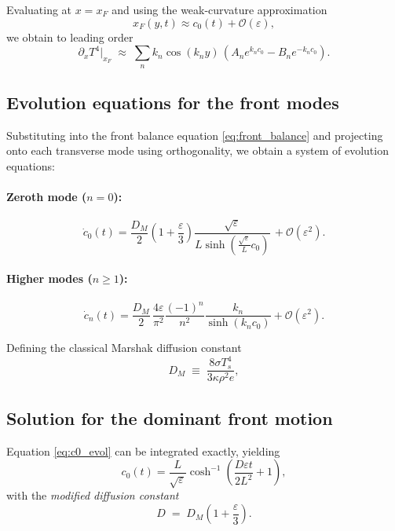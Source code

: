 \documentclass{article}
\begin{document}
Evaluating at $x=x_F$ and using the weak-curvature approximation
\[
x_F(y,t) \approx c_0(t) + \mathcal{O}(\varepsilon),
\]
we obtain to leading order
\begin{equation}
\partial_x T^4\big|_{x_F}
\;\approx\;
\sum_n k_n \cos(k_n y)\,
\left(A_n e^{k_n c_0} - B_n e^{-k_n c_0}\right).
\end{equation}

\subsection{Evolution equations for the front modes}

Substituting into the front balance equation \eqref{eq:front_balance} and projecting onto each transverse mode using orthogonality, we obtain a system of evolution equations:

\paragraph{Zeroth mode ($n=0$):}
\begin{equation}
\dot{c}_0(t)
=
\frac{D_M}{2}\left(1+\frac{\varepsilon}{3}\right)
\frac{\sqrt{\varepsilon}}{L\sinh\!\left(\frac{\sqrt{\varepsilon}}{L}c_0\right)}\,
+ \mathcal{O}(\varepsilon^2).
\label{eq:c0_evol}
\end{equation}

\paragraph{Higher modes ($n\ge1$):}
\begin{equation}
\dot{c}_n(t)
=
\frac{D_M}{2}\,
\frac{4\varepsilon}{\pi^2}
\frac{(-1)^{n}}{n^2}
\frac{k_n}{\sinh(k_n c_0)}
+ \mathcal{O}(\varepsilon^2).
\label{eq:cn_evol}
\end{equation}

Defining the classical Marshak diffusion constant
\begin{equation}
D_M \;\equiv\; \frac{8\sigma T_s^4}{3\kappa\rho^2 e},
\end{equation}

\subsection{Solution for the dominant front motion}

Equation \eqref{eq:c0_evol} can be integrated exactly, yielding
\begin{equation}
c_0(t)
=
\frac{L}{\sqrt{\varepsilon}}
\cosh^{-1}\!\left( \frac{D\varepsilon t}{2L^2} + 1 \right),
\label{eq:c0_solution}
\end{equation}
with the \emph{modified diffusion constant}
\begin{equation}
D \;=\; D_M\left(1+\frac{\varepsilon}{3}\right).
\end{equation}
\end{document}
